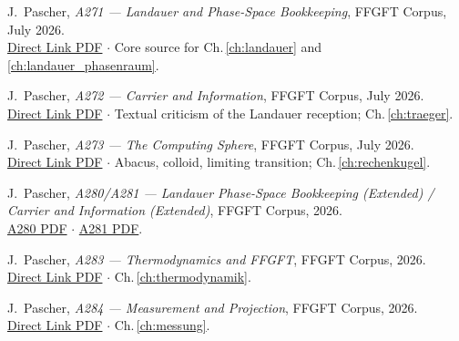 \begin{description}[leftmargin=3.5em,style=sameline,itemsep=0.4em]

\item[{[P1]}] J.~Pascher, \textit{A271 — Landauer and Phase-Space Bookkeeping},
  FFGFT Corpus, July 2026.\\
  \href{https://github.com/jpascher/T0-Time-Mass-Duality/blob/main/A_Serie_Export/pdf/A271_Landauer_De.pdf}{Direct Link PDF}
  $\cdot$ Core source for Ch.\,\ref{ch:landauer} and \ref{ch:landauer_phasenraum}.

\item[{[P2]}] J.~Pascher, \textit{A272 — Carrier and Information},
  FFGFT Corpus, July 2026.\\
  \href{https://github.com/jpascher/T0-Time-Mass-Duality/blob/main/A_Serie_Export/pdf/A272_Traeger_und_Information_De.pdf}{Direct Link PDF}
  $\cdot$ Textual criticism of the Landauer reception; Ch.\,\ref{ch:traeger}.

\item[{[P3]}] J.~Pascher, \textit{A273 — The Computing Sphere},
  FFGFT Corpus, July 2026.\\
  \href{https://github.com/jpascher/T0-Time-Mass-Duality/blob/main/A_Serie_Export/pdf/A273_Die_Rechenkugel_De.pdf}{Direct Link PDF}
  $\cdot$ Abacus, colloid, limiting transition; Ch.\,\ref{ch:rechenkugel}.

\item[{[P4]}] J.~Pascher, \textit{A280/A281 — Landauer Phase-Space Bookkeeping
  (Extended) / Carrier and Information (Extended)},
  FFGFT Corpus, 2026.\\
  \href{https://github.com/jpascher/T0-Time-Mass-Duality/blob/main/A_Serie_Export/pdf/A280_Landauer_Phasenraum_Buchhaltung_De.pdf}{A280 PDF}
  $\cdot$
  \href{https://github.com/jpascher/T0-Time-Mass-Duality/blob/main/A_Serie_Export/pdf/A281_Traeger_und_Information_De.pdf}{A281 PDF}.

\item[{[P5]}] J.~Pascher, \textit{A283 — Thermodynamics and FFGFT},
  FFGFT Corpus, 2026.\\
  \href{https://github.com/jpascher/T0-Time-Mass-Duality/blob/main/A_Serie_Export/pdf/A283_Thermodynamik_FFGFT_De.pdf}{Direct Link PDF}
  $\cdot$ Ch.\,\ref{ch:thermodynamik}.

\item[{[P6]}] J.~Pascher, \textit{A284 — Measurement and Projection},
  FFGFT Corpus, 2026.\\
  \href{https://github.com/jpascher/T0-Time-Mass-Duality/blob/main/A_Serie_Export/pdf/A284_Messung_Projektion_De.pdf}{Direct Link PDF}
  $\cdot$ Ch.\,\ref{ch:messung}.


\end{description}
